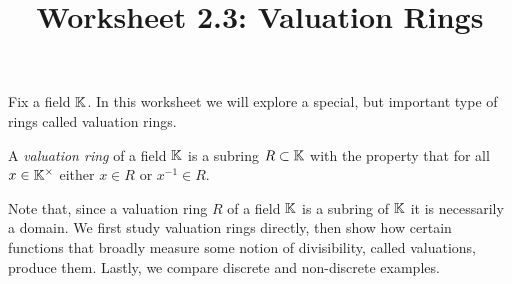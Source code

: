 \documentclass[12pt,reqno]{amsart}
\title{Worksheet 2.3: Valuation Rings}
\begin{document}

\maketitle
\thispagestyle{firstpage}

Fix a field $\mathbb{K}$. In this worksheet we will explore a special, but important type of rings called valuation rings. 
\begin{definition}
	A \emph{valuation ring} of a field $\mathbb{K}$ is a subring $R \subset \mathbb{K}$ with the property that for all $x \in \mathbb{K}^{\times}$ either $x \in R$ or $x^{-1} \in R$. 
\end{definition}

Note that, since a valuation ring $R$ of a field $\mathbb{K}$ is a subring of $\mathbb{K}$ it is necessarily a domain. We first study valuation rings directly, then show how certain functions that broadly measure some notion of divisibility, called valuations, produce them. Lastly, we compare discrete and non-discrete examples.


 \hrulefill 
\end{document}

